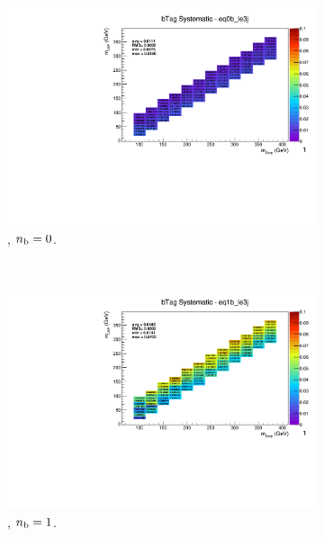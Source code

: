\begin{figure}[ht!]
\begin{subfigure}[b]{0.32\textwidth}
    \includegraphics[width=\textwidth, page=1]{Figs/sms/t2degen/v19_2/systs/T2_4body_bTag_eq0b_le3j.pdf}
    \caption{\njlow, $n_{\text{b}} = 0$.}
  \end{subfigure}\\
  \begin{subfigure}[b]{0.32\textwidth}
    \includegraphics[width=\textwidth, page=12]{Figs/sms/t2degen/v19_2/systs/T2_4body_bTag_eq1b_le3j.pdf}
    \caption{\njlow, $n_{\text{b}} = 1$.}
  \end{subfigure}
  \begin{subfigure}[b]{0.32\textwidth}

\end{subfigure}
\end{figure}
